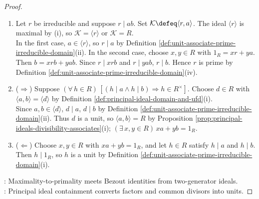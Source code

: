\begin{theorem}
\begin{proof}
\begin{enumerate}[label=(\roman*)]
\item[$(ii)$] Let $r$ be irreducible and suppose $r\mid ab$. Set $\mathcal{K}\defeq\langle r,a\rangle$. The ideal $\langle r\rangle$ is maximal by (i), so $\mathcal{K}=\langle r\rangle$ or $\mathcal{K}=R$.\\
In the first case, $a\in\langle r\rangle$, so $r\mid a$ by Definition \ref{def:unit-associate-prime-irreducible-domain}(ii). In the second case, choose $x,y\in R$ with $1_R=xr+ya$.\\
Then $b=xrb+yab$. Since $r\mid xrb$ and $r\mid yab$, $r\mid b$. Hence $r$ is prime by Definition \ref{def:unit-associate-prime-irreducible-domain}(iv).
\item[$(iii)$] ($\Rightarrow$) Suppose $(\forall\,h\in R)\,[(h\mid a\land h\mid b)\Rightarrow h\in R^\times]$. Choose $d\in R$ with $\langle a,b\rangle=\langle d\rangle$ by Definition \ref{def:principal-ideal-domain-and-ufd}(i).\\
Since $a,b\in\langle d\rangle$, $d\mid a$, $d\mid b$ by Definition \ref{def:unit-associate-prime-irreducible-domain}(ii). Thus $d$ is a unit, so $\langle a,b\rangle=R$ by Proposition \ref{prop:principal-ideals-divisibility-associates}(i); $(\exists\,x,y\in R)\,xa+yb=1_R$.
\item[$(iii)$] ($\Leftarrow$) Choose $x,y\in R$ with $xa+yb=1_R$, and let $h\in R$ satisfy $h\mid a$ and $h\mid b$. Then $h\mid1_R$, so $h$ is a unit by Definition \ref{def:unit-associate-prime-irreducible-domain}(i).
\end{enumerate}
: Maximality-to-primality meets Bezout identities from two-generator ideals.\\
: Principal ideal containment converts factors and common divisors into units.
\end{proof}
\end{theorem}

